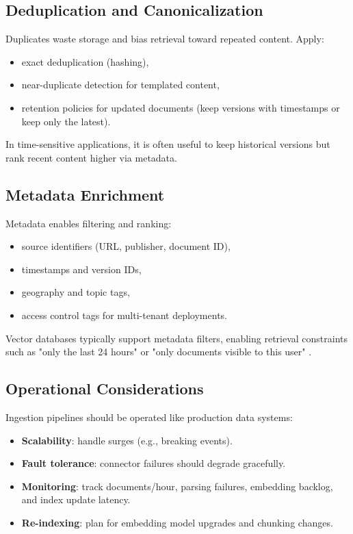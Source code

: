\subsection{Deduplication and Canonicalization}
Duplicates waste storage and bias retrieval toward repeated content. Apply:
\begin{itemize}
    \item exact deduplication (hashing),
    \item near-duplicate detection for templated content,
    \item retention policies for updated documents (keep versions with timestamps or keep only the latest).
\end{itemize}
In time-sensitive applications, it is often useful to keep historical versions but rank recent content higher via metadata.

\subsection{Metadata Enrichment}
Metadata enables filtering and ranking:
\begin{itemize}
    \item source identifiers (URL, publisher, document ID),
    \item timestamps and version IDs,
    \item geography and topic tags,
    \item access control tags for multi-tenant deployments.
\end{itemize}
Vector databases typically support metadata filters, enabling retrieval constraints such as "only the last 24 hours" or "only documents visible to this user" \cite{Pinecone2023RAG}.

\subsection{Operational Considerations}
Ingestion pipelines should be operated like production data systems:
\begin{itemize}
    \item \textbf{Scalability}: handle surges (e.g., breaking events).
    \item \textbf{Fault tolerance}: connector failures should degrade gracefully.
    \item \textbf{Monitoring}: track documents/hour, parsing failures, embedding backlog, and index update latency.
    \item \textbf{Re-indexing}: plan for embedding model upgrades and chunking changes.
\end{itemize}

